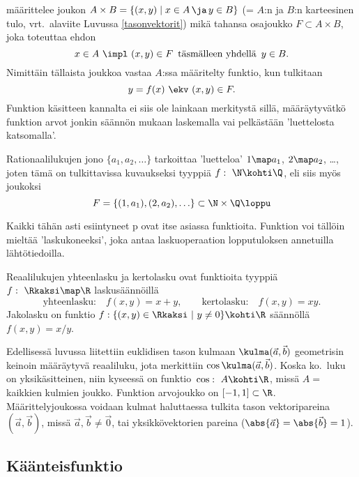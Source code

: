 määrittelee joukon $A \times B = \{(x,y) \mid x \in A\, \ja\, y \in B\}$ (= $A$:n ja $B$:n
karteesinen tulo, vrt.\ alaviite Luvussa \ref{tasonvektorit}) mikä tahansa osajoukko
$F \subset A \times B$, joka toteuttaa ehdon
\[
x \in A \ \impl \ (x,y) \in F\,\ \text{täsmälleen yhdellä}\,\ y \in B.
\]
Nimittäin tällaista joukkoa vastaa $A$:ssa määritelty funktio, kun tulkitaan
\[
y=f(x)\ \ekv\ (x,y) \in F.
\]
Funktion käsitteen kannalta ei siis ole lainkaan merkitystä sillä, määräytyvätkö funktion arvot
jonkin säännön mukaan laskemalla vai pelkästään 'luettelosta katsomalla'. 
\begin{Exa} Rationaalilukujen jono $\{a_1, a_2, \ldots\}$ tarkoittaa 'luetteloa' $1 \map a_1$, 
$2 \map a_2$, \ldots, joten tämä on tulkittavissa kuvaukseksi tyyppiä $f: \ \N \kohti \Q$, eli 
siis myös joukoksi
\[
F= \{ (1,a_1), (2,a_2),\ldots \} \subset \N \times \Q \loppu
\]
\end{Exa}
Kaikki tähän asti esiintyneet p ovat itse asiassa funktioita. 
Funktion voi tällöin mieltää 'laskukoneeksi', joka antaa laskuoperaation lopputuloksen
annetuilla lähtötiedoilla.
\begin{Exa}
Reaalilukujen yhteenlasku ja kertolasku ovat funktioita tyyppiä $f:\ \Rkaksi \map \R$ 
laskusäännöillä
\[
\text{yhteenlasku:} \quad f(x,y)=x+y, \qquad \text{kertolasku:} \quad f(x,y)=xy.
\]
Jakolasku on funktio $f: \{(x,y) \in \Rkaksi \ | \ y \neq 0 \} \kohti \R$ säännöllä
$f(x,y)=x/y$. \loppu
\end{Exa}
\begin{Exa} \label{skalaaritulo funktiona} Edellisessä luvussa liitettiin euklidisen tason
kulmaan $\kulma(\vec a,\vec b)$ geometrisin keinoin määräytyvä reaaliluku, jota merkittiin 
$\cos\kulma(\vec a,\vec b)$. Koska ko.\ luku on yksikäsitteinen, niin kyseessä on funktio 
$\,\cos:\ A \kohti \R$, missä $A=$ kaikkien kulmien joukko. Funktion arvojoukko on 
$[-1,1]\subset\R$. Määrittelyjoukossa voidaan kulmat haluttaessa tulkita tason vektoripareina
$(\vec a,\vec b)$, missä $\vec a,\vec b \neq \vec 0$, tai yksikkövektorien pareina 
($\abs{\vec a}=\abs{\vec b}=1$).  \loppu
\end{Exa}

\subsection*{Käänteisfunktio}

